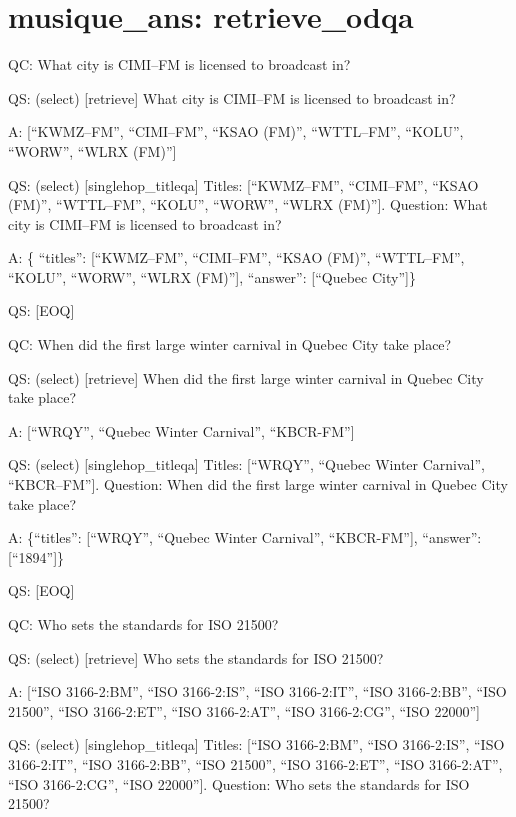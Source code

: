 \documentclass[
]{article}
\begin{document}
\section{musique\_ans: retrieve\_odqa}\label{musique_ans-retrieve_odqa}

QC: What city is CIMI--FM is licensed to broadcast in?

QS: (select) {[}retrieve{]} What city is CIMI--FM is licensed to
broadcast in?

A: {[}``KWMZ--FM'', ``CIMI--FM'', ``KSAO (FM)'', ``WTTL--FM'', ``KOLU'',
``WORW'', ``WLRX (FM)''{]}

QS: (select) {[}singlehop\_titleqa{]} Titles: {[}``KWMZ--FM'',
``CIMI--FM'', ``KSAO (FM)'', ``WTTL--FM'', ``KOLU'', ``WORW'', ``WLRX
(FM)''{]}. Question: What city is CIMI--FM is licensed to broadcast in?

A: \{ ``titles'': {[}``KWMZ--FM'', ``CIMI--FM'', ``KSAO (FM)'',
``WTTL--FM'', ``KOLU'', ``WORW'', ``WLRX (FM)''{]}, ``answer'':
{[}``Quebec City''{]}\}

QS: {[}EOQ{]}

QC: When did the first large winter carnival in Quebec City take place?

QS: (select) {[}retrieve{]} When did the first large winter carnival in
Quebec City take place?

A: {[}``WRQY'', ``Quebec Winter Carnival'', ``KBCR-FM''{]}

QS: (select) {[}singlehop\_titleqa{]} Titles: {[}``WRQY'', ``Quebec
Winter Carnival'', ``KBCR--FM''{]}. Question: When did the first large
winter carnival in Quebec City take place?

A: \{``titles'': {[}``WRQY'', ``Quebec Winter Carnival'',
``KBCR-FM''{]}, ``answer'': {[}``1894''{]}\}

QS: {[}EOQ{]}

QC: Who sets the standards for ISO 21500?

QS: (select) {[}retrieve{]} Who sets the standards for ISO 21500?

A: {[}``ISO 3166-2:BM'', ``ISO 3166-2:IS'', ``ISO 3166-2:IT'', ``ISO
3166-2:BB'', ``ISO 21500'', ``ISO 3166-2:ET'', ``ISO 3166-2:AT'', ``ISO
3166-2:CG'', ``ISO 22000''{]}

QS: (select) {[}singlehop\_titleqa{]} Titles: {[}``ISO 3166-2:BM'',
``ISO 3166-2:IS'', ``ISO 3166-2:IT'', ``ISO 3166-2:BB'', ``ISO 21500'',
``ISO 3166-2:ET'', ``ISO 3166-2:AT'', ``ISO 3166-2:CG'', ``ISO
22000''{]}. Question: Who sets the standards for ISO 21500?
\end{document}
